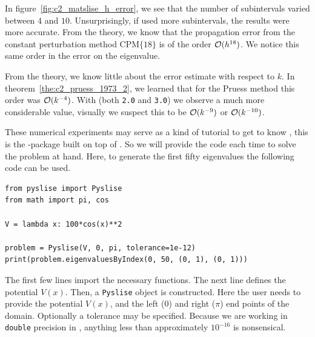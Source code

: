 In figure~\ref{fig:c2_matslise_h_error}, we see that the number of subintervals varied between $4$ and $10$. Unsurprisingly, if \matslise{} used more subintervals, the results were more accurate. From the theory, we know that the propagation error from the constant perturbation method $\text{CPM}\{18\}$ is of the order $\operatorname{\mathcal{O}}(h^{18})$. We notice this same order in the error on the eigenvalue.

From the theory, we know little about the error estimate with respect to $k$. In theorem~\ref{the:c2_pruess_1973_2}, we learned that for the Pruess method this order was $\operatorname{\mathcal{O}}(k^{-4})$. With \matslise{} (both \texttt{2.0} and \texttt{3.0}) we observe a much more considerable value, visually we suspect this to be $\operatorname{\mathcal{O}}(k^{-9})$ or $\operatorname{\mathcal{O}}(k^{-10})$.

These numerical experiments may serve as a kind of tutorial to get to know \pyslise{}, this is the \lpython{}-package built on top of . So we will provide the code each time to solve the problem at hand. Here, to generate the first fifty eigenvalues the following code can be used.
\begin{verbatim}
from pyslise import Pyslise
from math import pi, cos

V = lambda x: 100*cos(x)**2

problem = Pyslise(V, 0, pi, tolerance=1e-12)
print(problem.eigenvaluesByIndex(0, 50, (0, 1), (0, 1)))
\end{verbatim}

The first few lines import the necessary functions. The next line defines the potential $V(x)$. Then, a \texttt{Pyslise} object is constructed. Here the user needs to provide the potential $V(x)$, and the left ($0$) and right ($\pi$) end points of the domain. Optionally a tolerance may be specified. Because we are working in \texttt{double} precision in \lpython{}, anything less than approximately $10^{-16}$ is nonsensical.

